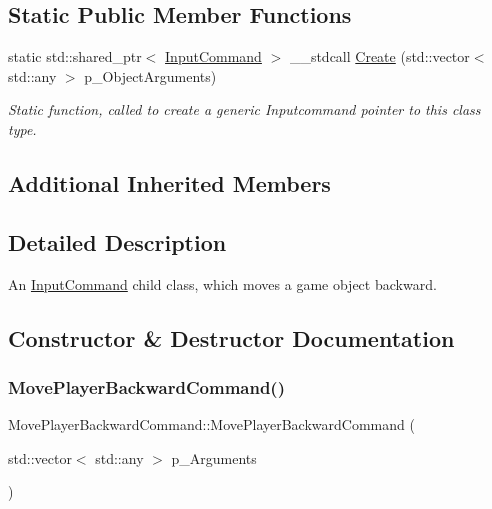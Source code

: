 \subsection*{Static Public Member Functions}
\begin{DoxyCompactItemize}
\item 
static std\+::shared\+\_\+ptr$<$ \mbox{\hyperlink{class_input_command}{Input\+Command}} $>$ \+\_\+\+\_\+stdcall \mbox{\hyperlink{class_move_player_backward_command_aff6b8aaa19742d29f54eedfdd3856f6c}{Create}} (std\+::vector$<$ std\+::any $>$ p\+\_\+\+Object\+Arguments)
\begin{DoxyCompactList}\small\item\em Static function, called to create a generic Inputcommand pointer to this class type. \end{DoxyCompactList}\end{DoxyCompactItemize}
\subsection*{Additional Inherited Members}


\subsection{Detailed Description}
An \mbox{\hyperlink{class_input_command}{Input\+Command}} child class, which moves a game object backward. 

\subsection{Constructor \& Destructor Documentation}
\mbox{\label{class_move_player_backward_command_a224ce8339fde165126b204039487863b}} 
\subsubsection{\texorpdfstring{MovePlayerBackwardCommand()}{MovePlayerBackwardCommand()}}
{\footnotesize\ttfamily Move\+Player\+Backward\+Command\+::\+Move\+Player\+Backward\+Command (\begin{DoxyParamCaption}\item[{std\+::vector$<$ std\+::any $>$}]{p\+\_\+\+Arguments }\end{DoxyParamCaption})\hspace{0.3cm}{\ttfamily [inline]}}



